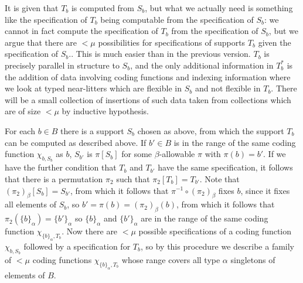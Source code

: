 \documentclass[112pt]{article}
\begin{document}
\begin{description}
It is given that $T_b$ is computed from
$S_b$, but what we actually need is something like the specification of $T_b$ being computable from the specification of $S_b$:  we cannot in fact compute the specification of $T_b$ from the specification of $S_b$, but we argue that there are $<\mu$ possibilities for specifications of supports $T_b$ given the specification of $S_b$..   This is much easier than in the previous version.
$T_b$ is precisely parallel in structure to $S_b$, and the only additional information in $T_b^*$  is the addition of data involving coding functions and indexing information where we look at typed near-litters which are flexible in $S_b$ and not flexible in $T_b$.  There will be a small collection of insertions of such data taken from collections which are of size $<\mu$ by inductive hypothesis.



For each $b \in B$ there is a support $S_b$ chosen as above, from which the support $T_b$ can be computed as described above.  If $b' \in B$ is in the range of the same coding function $\chi_{b,S_b}$ as $b$, $S_{b'}$ is $\pi[S_{b}]$ for some $\beta$-allowable $\pi$ with $\pi(b) = b'$.
If we have the further condition that $T_b$ and $T_{b'}$ have the same specification, it follows that there is a permutation $\pi_2$ such that $\pi_2[T_b] = T_{b'}$.  Note that $(\pi_2)_\beta[S_b]=S_{b'}$, from which it follows that $\pi^{-1} \circ (\pi_2)_\beta$ fixes $b$, since it fixes all elements of $S_b$, so $b'=\pi(b) = (\pi_2)_\beta(b)$, from which it follows
that $\pi_2(\{b\}_\alpha) = \{b'\}_\alpha$ so $\{b\}_\alpha$ and $\{b'\}_\alpha$ are in the range of the same coding function $\chi_{\{b\}_\alpha,T_b}$.  Now there are $<\mu$ possible specifications of a coding function $\chi_{b,S_b}$ followed by a specification for $T_b$, so by this procedure we describe a family of $<\mu$ coding functions $\chi_{\{b\}_\alpha,T_b}$ whose range covers all type $\alpha$ singletons of elements of $B$.

 



\begin{comment}


\end{comment}
\end{description}
\end{document}
